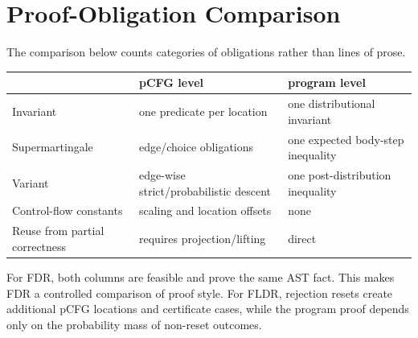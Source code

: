 \section{Proof-Obligation Comparison}
\label{app:comparison}

The comparison below counts categories of obligations rather than lines of prose.

\begin{center}
\begin{tabular}{@{}lll@{}}
\toprule
 & pCFG level & program level\\
\midrule
Invariant & one predicate per location & one distributional invariant\\
Supermartingale & edge/choice obligations & one expected body-step inequality\\
Variant & edge-wise strict/probabilistic descent & one post-distribution inequality\\
Control-flow constants & scaling and location offsets & none\\
Reuse from partial correctness & requires projection/lifting & direct\\
\bottomrule
\end{tabular}
\end{center}

For FDR, both columns are feasible and prove the same AST fact. This makes FDR a controlled comparison of proof style. For FLDR, rejection resets create additional pCFG locations and certificate cases, while the program proof depends only on the probability mass of non-reset outcomes.
